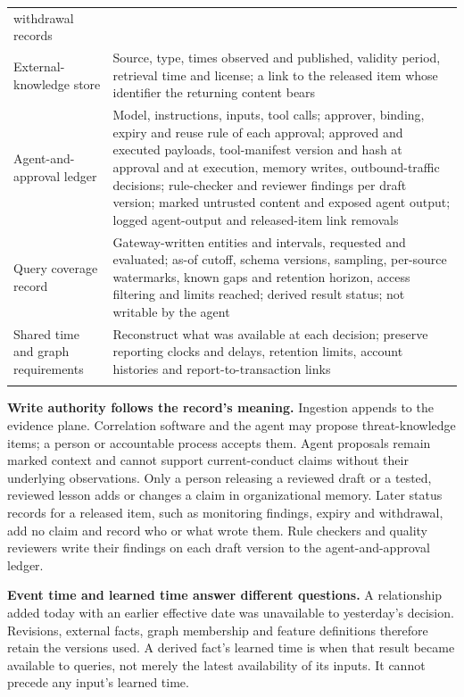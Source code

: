 \documentclass[
  11pt,
]{article}
\begin{document}
\begin{table}[tp]
{\begin{tabular}{@{}
  >{\raggedright\arraybackslash}p{}
  >{\raggedright\arraybackslash}p{}@{}}
withdrawal records \\
External-knowledge store & Source, type, times observed and published,
validity period, retrieval time and license; a link to the released item
whose identifier the returning content bears \\
Agent-and-approval ledger & Model, instructions, inputs, tool calls;
approver, binding, expiry and reuse rule of each approval; approved and
executed payloads, tool-manifest version and hash at approval and at
execution, memory writes, outbound-traffic decisions; rule-checker and
reviewer findings per draft version; marked untrusted content and
exposed agent output; logged agent-output and released-item link
removals \\
Query coverage record & Gateway-written entities and intervals,
requested and evaluated; as-of cutoff, schema versions, sampling,
per-source watermarks, known gaps and retention horizon, access
filtering and limits reached; derived result status; not writable by the
agent \\
Shared time and graph requirements & Reconstruct what was available at
each decision; preserve reporting clocks and delays, retention limits,
account histories and report-to-transaction links \\

\bottomrule\noalign{}
\end{tabular}
}
\end{table}

\textbf{Write authority follows the record's meaning.} Ingestion appends
to the evidence plane. Correlation software and the agent may propose
threat-knowledge items; a person or accountable process accepts them.
Agent proposals remain marked context and cannot support current-conduct
claims without their underlying observations. Only a person releasing a
reviewed draft or a tested, reviewed lesson adds or changes a claim in
organizational memory. Later status records for a released item, such as
monitoring findings, expiry and withdrawal, add no claim and record who
or what wrote them. Rule checkers and quality reviewers write their
findings on each draft version to the agent-and-approval ledger.

\textbf{Event time and learned time answer different questions.} A
relationship added today with an earlier effective date was unavailable
to yesterday's decision. Revisions, external facts, graph membership and
feature definitions therefore retain the versions used. A derived fact's
learned time is when that result became available to queries, not merely
the latest availability of its inputs. It cannot precede any input's
learned time.
\end{document}

